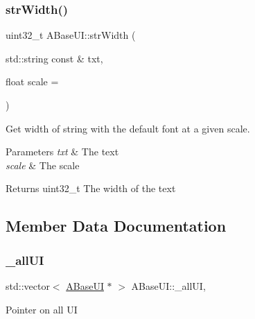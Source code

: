 \subsubsection{\texorpdfstring{str\+Width()}{strWidth()}\hspace{0.1cm}{\footnotesize\ttfamily [2/2]}}
{\footnotesize\ttfamily uint32\+\_\+t A\+Base\+U\+I\+::str\+Width (\begin{DoxyParamCaption}\item[{std\+::string const \&}]{txt,  }\item[{float}]{scale = {} }\end{DoxyParamCaption})\hspace{0.3cm}{\ttfamily [static]}}



Get width of string with the default font at a given scale. 


\begin{DoxyParams}{Parameters}
{\em txt} & The text \\
\hline
{\em scale} & The scale \\
\hline
\end{DoxyParams}
\begin{DoxyReturn}{Returns}
uint32\+\_\+t The width of the text 
\end{DoxyReturn}


\subsection{Member Data Documentation}
\mbox{\label{class_a_base_u_i_a6393ba47436d10167aff033f28f01980}} 
\subsubsection{\texorpdfstring{\+\_\+all\+UI}{\_allUI}}
{\footnotesize\ttfamily std\+::vector$<$ \hyperlink{class_a_base_u_i}{A\+Base\+UI} $\ast$ $>$ A\+Base\+U\+I\+::\+\_\+all\+UI\hspace{0.3cm}{\ttfamily [static]}, {\ttfamily [protected]}}

Pointer on all UI \mbox{\label{class_a_base_u_i_a27c378b1380fdce4db9fb03d43684b93}} 
